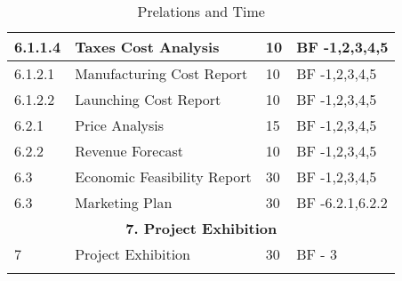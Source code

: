 \begin{longtable}{ | p{1.3cm} | p{7cm} | p{3cm} | p{3.5cm} |}
6.1.1.4 & Taxes Cost Analysis  & 10 & BF -1,2,3,4,5  \\ \hline
6.1.2.1 & Manufacturing Cost Report & 10 & BF -1,2,3,4,5  \\ \hline
6.1.2.2 & Launching Cost Report  & 10 & BF -1,2,3,4,5 \\ \hline
6.2.1 & Price Analysis & 15 & BF -1,2,3,4,5  \\ \hline
6.2.2 & Revenue Forecast & 10 & BF -1,2,3,4,5  \\ \hline
6.3 & Economic Feasibility Report & 30 & BF -1,2,3,4,5 \\ \hline
6.3 & Marketing Plan & 30 & BF -6.2.1,6.2.2 \\ \hline
\multicolumn{4}{|c|}{\textbf{7. Project Exhibition}} \\ \hline
7 & Project Exhibition &30 & BF - 3 \\ \hline
\caption{Prelations and Time} \\
\end{longtable}